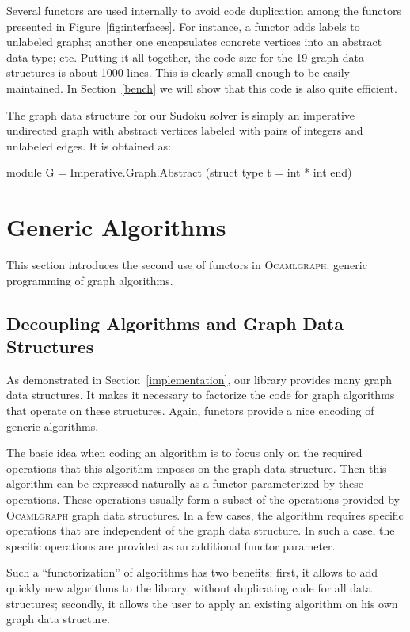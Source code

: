 \documentclass[tfpsymp,pagenumbers]{tfp07symp}
\newcommand{\ocamlgraph}{\textsc{Ocamlgraph}\xspace}
\begin{document}
Several functors are used internally to avoid code duplication among the
functors presented in Figure~\ref{fig:interfaces}. For instance, a
functor adds labels to 
unlabeled graphs; another one encapsulates concrete vertices into an
abstract data type; etc.  Putting it all together, the code size for
the 19 graph data structures is about 1000 lines. This is clearly
small enough to be easily maintained. In Section~\ref{bench} we will
show that this code is also quite efficient.

The graph data structure for our Sudoku solver is simply an imperative
undirected graph with abstract vertices labeled with pairs of integers
and unlabeled edges. It is obtained as:
\begin{ocaml}
module G = Imperative.Graph.Abstract
             (struct type t = int * int end) 
\end{ocaml}

\section{Generic Algorithms}\label{algos}

This section introduces the second use of functors in \ocamlgraph:
generic programming of graph algorithms.

\subsection{Decoupling Algorithms and Graph Data Structures}

As demonstrated in Section~\ref{implementation}, our library provides
many graph data structures. It makes it necessary to factorize the
code for graph algorithms that operate on these structures. Again,
functors provide a nice encoding of generic algorithms.

The basic idea when coding an algorithm is to focus only on the
required operations that this algorithm imposes on the graph data
structure. Then this algorithm can be expressed naturally as a functor
parameterized by these operations. These operations usually form a
subset of the operations provided by \ocamlgraph graph data
structures. In a few cases, the algorithm requires specific operations
that are independent of the graph data structure. In such a case, the
specific operations are provided as an additional functor parameter.

Such a ``functorization'' of algorithms has two benefits: first, it
allows to add quickly new algorithms to the library, without
duplicating code for all data structures; secondly, it allows the user to
apply an existing algorithm on his own graph data structure.
\end{document}
